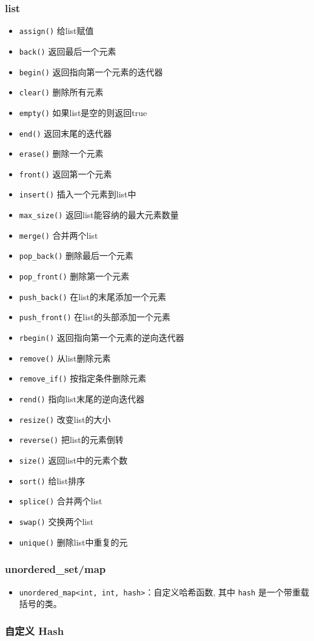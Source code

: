 \subsubsection{list}
	\begin{itemize}
		\item \texttt{assign()} 给list赋值 
		\item \texttt{back()} 返回最后一个元素 
		\item \texttt{begin()} 返回指向第一个元素的迭代器 
		\item \texttt{clear()} 删除所有元素 
		\item \texttt{empty()} 如果list是空的则返回true 
		\item \texttt{end()} 返回末尾的迭代器
		\item \texttt{erase()} 删除一个元素
		\item \texttt{front()} 返回第一个元素
		\item \texttt{insert()} 插入一个元素到list中
		\item \texttt{max_size()} 返回list能容纳的最大元素数量
		\item \texttt{merge()} 合并两个list
		\item \texttt{pop_back()} 删除最后一个元素
		\item \texttt{pop_front()} 删除第一个元素
		\item \texttt{push_back()} 在list的末尾添加一个元素
		\item \texttt{push_front()} 在list的头部添加一个元素
		\item \texttt{rbegin()} 返回指向第一个元素的逆向迭代器
		\item \texttt{remove()} 从list删除元素
		\item \texttt{remove_if()} 按指定条件删除元素
		\item \texttt{rend()} 指向list末尾的逆向迭代器
		\item \texttt{resize()} 改变list的大小
		\item \texttt{reverse()} 把list的元素倒转
		\item \texttt{size()} 返回list中的元素个数
		\item \texttt{sort()} 给list排序
		\item \texttt{splice()} 合并两个list
		\item \texttt{swap()} 交换两个list
		\item \texttt{unique()} 删除list中重复的元
	\end{itemize}

\subsubsection{unordered\_set/map}

\begin{itemize}
	\item \texttt{unordered_map<int, int, hash>}：自定义哈希函数, 其中 \texttt{hash} 是一个带重载括号的类。
\end{itemize}

\subsubsection{自定义 Hash}
	\inputminted{cpp}{../src/misc/hash.cpp}
